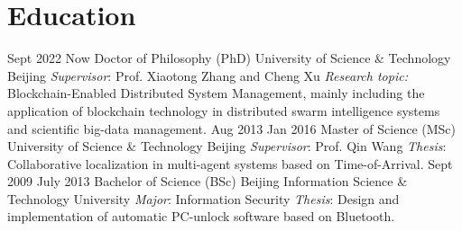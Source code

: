 \ifswedish
\else
    \section{Education}
        \positioon
            {Sept 2022 \textemdash{} Now}
            {Doctor of Philosophy (PhD)}
            {University of Science \& Technology Beijing}
            {\textit{Supervisor}: Prof. Xiaotong Zhang and Cheng Xu}
            {\textit{Research topic:} Blockchain-Enabled Distributed System Management, mainly including the application of blockchain technology in distributed swarm intelligence systems and scientific big-data management.}
        \positioon
            {Aug 2013 \textemdash{} Jan 2016}
            {Master of Science (MSc)}
            {University of Science \& Technology Beijing}
            {\textit{Supervisor}: Prof. Qin Wang}
            {\textit{Thesis}: Collaborative localization in multi-agent systems based on Time-of-Arrival.}
        \position
			{Sept 2009 \textemdash{} July 2013}
			{Bachelor of Science (BSc)}
			{Beijing Information Science \& Technology University}
			{\textit{Major}: Information Security \newline
			\textit{Thesis}: Design and implementation of automatic PC-unlock software based on Bluetooth.}
\fi